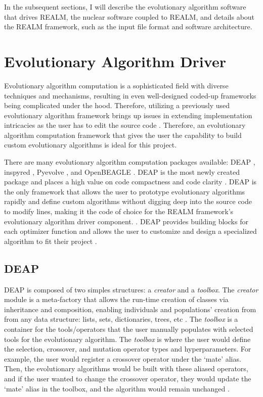 In the subsequent sections, I will describe the evolutionary algorithm software 
that drives \gls{REALM}, the nuclear software coupled to REALM, and details about 
the \gls{REALM} framework, such as the input file format and software architecture. 

\section{Evolutionary Algorithm Driver}
Evolutionary algorithm computation is a sophisticated field with diverse techniques 
and mechanisms, resulting in even well-designed coded-up frameworks being complicated 
under the hood. 
Therefore, utilizing a previously used evolutionary algorithm framework brings 
up issues in extending implementation intricacies as the user has to edit the 
source code \cite{fortin_deap_2012}. 
Therefore, an evolutionary algorithm computation framework that gives the user the 
capability to build custom evolutionary algorithms is ideal for this project.

There are many evolutionary algorithm computation packages available: 
\gls{DEAP} \cite{fortin_deap_2012}, inspyred \cite{garrett_inspyred_2014}, 
Pyevolve \cite{perone_pyevolve_2009}, and OpenBEAGLE \cite{gagne_open_2002}.
\gls{DEAP} is the most newly created package and places a high value on code 
compactness and code clarity \cite{fortin_deap_2012}. 
\gls{DEAP} is the only framework that allows the user to prototype evolutionary 
algorithms rapidly and define custom algorithms without digging deep into 
the source code to modify lines, making it the code of choice for the REALM 
framework's evolutionary algorithm driver component. .  
\gls{DEAP} provides building blocks for each optimizer function and allows the 
user to customize and design a specialized algorithm to fit their project
\cite{fortin_deap_2012}.

\subsection{\acrlong{DEAP}}
\label{sec:deap-works}
\gls{DEAP} is composed of two simples structures: a \textit{creator} and a 
\textit{toolbox}.  
The \textit{creator} module is a meta-factory that allows the run-time creation 
of classes via inheritance and composition, enabling individuals and populations' 
creation from  from any data structure: lists, sets, dictionaries, trees, 
etc \cite{fortin_deap_2012}. 
The \textit{toolbox} is a container for the tools/operators that the user 
manually populates with selected tools for the evolutionary algorithm.
The \textit{toolbox} is where the user would define the selection, crossover, 
and mutation operator types and hyperparameters. 
For example, the user would register a crossover operator under the `mate'
alias. 
Then, the evolutionary algorithms would be built with these aliased operators, 
and if the user wanted to change the crossover operator, they would update the 
`mate' alias in the toolbox, and the algorithm would remain unchanged
\cite{fortin_deap_2012}. 

